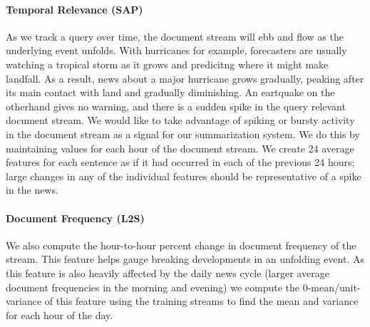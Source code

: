 

\paragraph{Temporal Relevance (SAP)} As we track a query over time, the document
stream will ebb and flow as the underlying event unfolds. With hurricanes
for example, forecasters are usually watching a tropical storm as it grows
and predicitng where it might make landfall. As a result, news about a major
hurricane grows gradually, peaking after its main contact with land
and gradually diminishing. An eartquake on the otherhand gives no warning,
and there is a sudden spike in the query relevant document stream.
We would like to take advantage of spiking or bursty
activity in the document stream as a signal for our summarization system.
We do this by maintaining \idf{} values for each hour of the document stream.
We create 24 average \tfidf{} features for each sentence as if it had occurred
in each of the previous 24 hours; large changes in any of the individual
features should be representative of a spike in the news.

\paragraph{Document Frequency (L2S)} We also compute the hour-to-hour
percent change in document frequency of the stream. This
feature helps gauge breaking developments in an unfolding
event. As this feature is also heavily affected by the daily
news cycle (larger average document frequencies in the morning
and evening) we compute the 0-mean/unit-variance of this
feature using the training streams to find the mean and variance
for each hour of the day.

